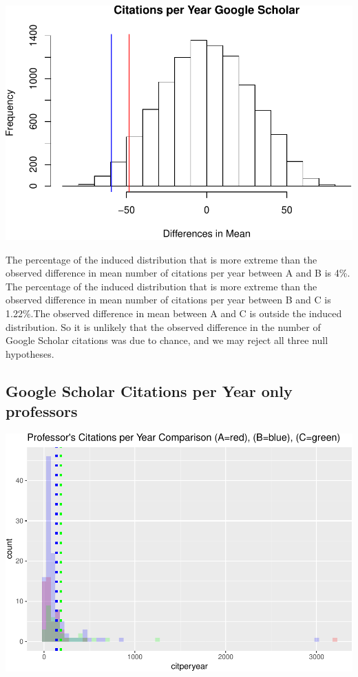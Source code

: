 \documentclass[]{article}
\begin{document}
\includegraphics{final_files/figure-latex/unnamed-chunk-65-1.pdf}

The percentage of the induced distribution that is more extreme than the
observed difference in mean number of citations per year between A and B
is 4\%. The percentage of the induced distribution that is more extreme
than the observed difference in mean number of citations per year
between B and C is 1.22\%.The observed difference in mean between A and
C is outside the induced distribution. So it is unlikely that the
observed difference in the number of Google Scholar citations was due to
chance, and we may reject all three null hypotheses.

\hypertarget{google-scholar-citations-per-year-only-professors}{%
\subsection{Google Scholar Citations per Year only
professors}\label{google-scholar-citations-per-year-only-professors}}

\includegraphics{final_files/figure-latex/unnamed-chunk-67-1.pdf}
\end{document}
